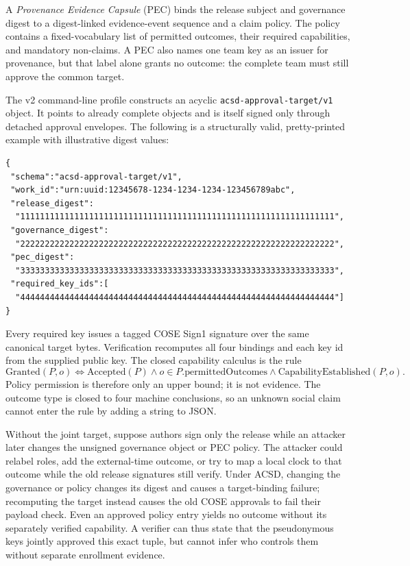 \documentclass[11pt]{article}
\begin{document}
A \emph{Provenance Evidence Capsule} (PEC) binds the release subject and
governance digest to a digest-linked evidence-event sequence and a claim
policy. The policy contains a fixed-vocabulary list of permitted outcomes,
their required capabilities, and mandatory non-claims. A PEC also names one
team key as an issuer for provenance, but that label alone grants no outcome:
the complete team must still approve the common target.

The v2 command-line profile constructs an acyclic
\texttt{acsd-approval-target/v1} object. It points to already complete objects
and is itself signed only through detached approval envelopes. The following is
a structurally valid, pretty-printed example with illustrative digest values:

\begin{verbatim}
{
 "schema":"acsd-approval-target/v1",
 "work_id":"urn:uuid:12345678-1234-1234-1234-123456789abc",
 "release_digest":
  "1111111111111111111111111111111111111111111111111111111111111111",
 "governance_digest":
  "2222222222222222222222222222222222222222222222222222222222222222",
 "pec_digest":
  "3333333333333333333333333333333333333333333333333333333333333333",
 "required_key_ids":[
  "4444444444444444444444444444444444444444444444444444444444444444"]
}
\end{verbatim}

Every required key issues a tagged COSE Sign1 signature over the same
canonical target bytes. Verification recomputes all four bindings and each key
id from the supplied public key. The closed capability calculus is the rule
\[
 \mathrm{Granted}(P,o) \iff \mathrm{Accepted}(P)
 \land o\in P.\mathrm{permittedOutcomes}
 \land \mathrm{CapabilityEstablished}(P,o).
\]
Policy permission is therefore only an upper bound; it is not evidence. The
outcome type is closed to four machine conclusions, so an unknown social claim
cannot enter the rule by adding a string to JSON.

Without the joint target, suppose authors sign only the release while an
attacker later changes the unsigned governance object or PEC policy. The
attacker could relabel roles, add the external-time outcome, or try to map a
local clock to that outcome while the old release signatures still verify.
Under ACSD, changing the governance or policy changes its digest and causes a
target-binding failure; recomputing the target instead causes the old COSE
approvals to fail their payload check. Even an approved policy entry yields no
outcome without its separately verified capability. A verifier can thus state
that the pseudonymous keys jointly approved this exact tuple, but cannot infer
who controls them without separate enrollment evidence.
\end{document}
